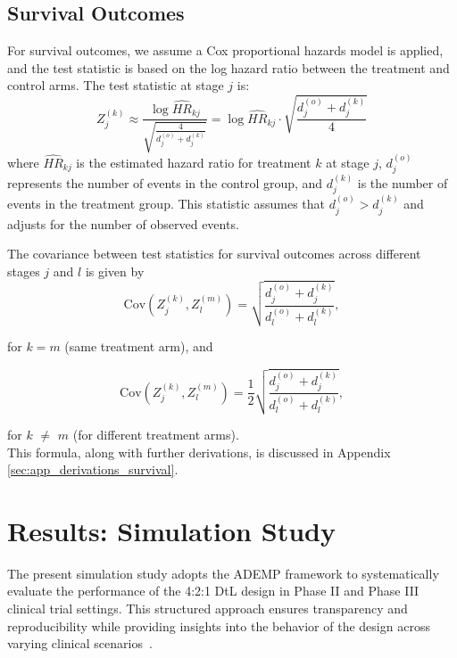 \documentclass[11pt, a4paper]{article}\usepackage[]{graphicx}\usepackage[]{xcolor}
\begin{document}
\subsection{Survival Outcomes}\label{sec:survival_outcomes}
For survival outcomes, we assume a Cox proportional hazards model is applied, and the test statistic is based on the log hazard ratio between the treatment and control arms. The test statistic at stage $j$ is:
\begin{equation}
Z_j^{(k)} \approx \frac{\log \widehat{HR}_{kj}}{\sqrt{\frac{4}{d_j^{(o)} + d_j^{(k)}}}} = \log \widehat{HR}_{kj} \cdot \sqrt{\frac{d_j^{(o)} + d_j^{(k)}}{4}}
\end{equation}
where $\widehat{HR}_{kj}$ is the estimated hazard ratio for treatment $k$ at stage $j$, $d_j^{(o)}$ represents the number of events in the control group, and $d_j^{(k)}$ is the number of events in the treatment group. This statistic assumes that $d_j^{(o)} > d_j^{(k)}$ and adjusts for the number of observed events.

The covariance between test statistics for survival outcomes across different stages $j$ and $l$ is given by
\begin{equation}
\text{Cov}(Z_j^{(k)}, Z_l^{(m)}) = \sqrt{\frac{d_j^{(o)} + d_j^{(k)}}{d_l^{(o)} + d_l^{(k)}}}\label{eq:survival_covariance1},
\end{equation}

for $k = m$ (same treatment arm), and

\begin{equation}
\text{Cov}(Z_j^{(k)}, Z_l^{(m)}) = \frac{1}{2} \sqrt{\frac{d_j^{(o)} + d_j^{(k)}}{d_l^{(o)} + d_l^{(k)}}}\label{eq:survival_covariance2},
\end{equation}

for $k$ $\neq$ $m$ (for different treatment arms).\\


This formula, along with further derivations, is discussed in Appendix \ref{sec:app_derivations_survival}.


\newpage
\section{Results: Simulation Study} \label{sec:simulation_results}

The present simulation study adopts the ADEMP framework to systematically evaluate the performance of the 4:2:1 DtL design in Phase II and Phase III clinical trial settings. This structured approach ensures transparency and reproducibility while providing insights into the behavior of the design across varying clinical scenarios~\citep{Morris2019, Burton2006}.
\end{document}
